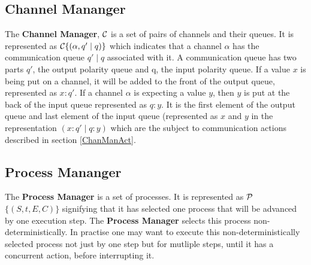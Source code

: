 \documentclass[11pt]{article}
\newcommand{\<}{\langle}
\renewcommand{\>}{\rangle}
\begin{document}
\subsection {Channel Mananger}
The {\bf Channel Manager}, $\cal C$ is a set of pairs of channels and their queues. It is represented as  ${\cal C}\{ (\alpha,q' \mid q) \}$ which indicates that a channel $\alpha$ has the communication queue $q' \mid q$ associated with it. A communication queue has two parts $q'$, the output polarity queue and q, the input polarity queue. If a value $x$ is being put on a channel, it will be added to the front of the output queue, represented as $x:q'$. If a channel $\alpha$ is expecting a value $y$, then $y$ is put at the back of the input queue represented as $q:y$. It is the first element of the output queue and last element of the input queue (represented as $x$ and $y$ in the representation $(x:q' \mid q:y)$ which are the subject to communication actions described in section \ref {ChanManAct}. 
\subsection {Process Mananger}
The {\bf Process Manager} is a set of processes. It is represented as $\cal P$ $\{(S,t,E,C)\}$ signifying that it has selected one process that will be advanced by one execution step. The {\bf Process Manager} selects this process non-deterministically. In practise one may want to execute this non-deterministically selected process not just by one step but for mutliple steps, until it has a concurrent action, before interrupting it.
\end{document}
